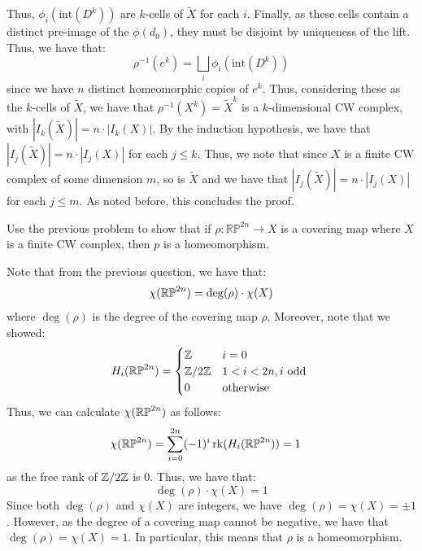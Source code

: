 \documentclass[12pt]{article}
\begin{document}
\begin{solution}
\begin{enumerate}
    \end{enumerate}
    Thus, $\phi_i(\text{int}(D^k))$ are $k$-cells of $\widetilde{X}$ for each $i$. Finally, as these cells contain a distinct pre-image of the $\phi(d_0)$, they must be disjoint by uniqueness of the lift. Thus, we have that: 
    \[ \rho^{-1}(e^k) = \bigsqcup_i \phi_i(\text{int}(D^k))\]
    since we have $n$ distinct homeomorphic copies of $e^k$. Thus, considering these as the $k$-cells of $\widetilde{X}$, we have that $\rho^{-1}(X^k) = \widetilde{X}^k$ is a $k$-dimensional CW complex, with $|I_k(\widetilde{X})| = n \cdot |I_k(X)|$. By the induction hypothesis, we have that $|I_j(\widetilde{X})| = n \cdot |I_j(X)|$ for each $j \leq k$. \bbni
    Thus, we note that since $X$ is a finite CW complex of some dimension $m$, so is $\widetilde{X}$ and we have that $|I_j(\widetilde{X})| = n \cdot |I_j(X)|$ for each $j \leq m$. As noted before, this concludes the proof.
\end{solution}
\newpage

\begin{problem}{5}
    Use the previous problem to show that if $\rho \colon \mathbb{RP}^{2n} \to X$ is a covering map where $X$ is a finite CW complex, then $p$ is a homeomorphism.    
\end{problem}
\begin{solution}
    Note that from the previous question, we have that: 
    \[ \chi(\mathbb{RP}^{2n}) = \deg(\rho) \cdot \chi(X)\]
    where $\deg(\rho)$ is the degree of the covering map $\rho$. Moreover, note that we showed: 
    \[ H_i(\mathbb{RP}^{2n}) = \begin{cases}
        \mathbb Z & i = 0 \\
        \mathbb Z/2\mathbb Z & 1 < i < 2n, i \text{ odd } \\
        0 & \text{otherwise}
    \end{cases}\]
    Thus, we can calculate $\chi(\mathbb{RP}^{2n})$ as follows:
    \begin{align*}
        \chi(\mathbb{RP}^{2n}) &= \sum_{i=0}^{2n} (-1)^i \operatorname{rk}(H_i(\mathbb{RP}^{2n})) = 1 
    \end{align*}
    as the free rank of $\mathbb Z/2\mathbb Z$ is $0$. Thus, we have that: 
    \[\deg(\rho) \cdot \chi(X) = 1\]
    Since both $\deg(\rho)$ and $\chi(X)$ are integers, we have $\deg(\rho) = \chi(X) = \pm 1$. However, as the degree of a covering map cannot be negative, we have that $\deg(\rho) = \chi(X) = 1$. In particular, this means that $\rho$ is a homeomorphism. 
\end{solution}
\end{document}
